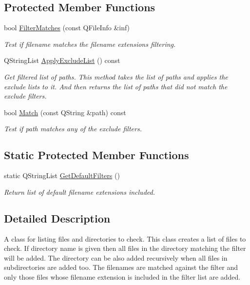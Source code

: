 \subsection*{Protected Member Functions}
\begin{DoxyCompactItemize}
\item 
bool \hyperlink{class_file_list_aa6de1569578fa3d9cfcbb51443680eb4}{Filter\-Matches} (const Q\-File\-Info \&inf)
\begin{DoxyCompactList}\small\item\em Test if filename matches the filename extensions filtering. \end{DoxyCompactList}\item 
Q\-String\-List \hyperlink{class_file_list_a3e55ac6cd21ebc3a06b556b649faa73a}{Apply\-Exclude\-List} () const 
\begin{DoxyCompactList}\small\item\em Get filtered list of paths. This method takes the list of paths and applies the exclude lists to it. And then returns the list of paths that did not match the exclude filters. \end{DoxyCompactList}\item 
bool \hyperlink{class_file_list_ad6769459107e55bd4c33761aab4cf6d7}{Match} (const Q\-String \&path) const 
\begin{DoxyCompactList}\small\item\em Test if path matches any of the exclude filters. \end{DoxyCompactList}\end{DoxyCompactItemize}
\subsection*{Static Protected Member Functions}
\begin{DoxyCompactItemize}
\item 
static Q\-String\-List \hyperlink{class_file_list_a2862f25abf1f3036edc6e4504bbfb87f}{Get\-Default\-Filters} ()
\begin{DoxyCompactList}\small\item\em Return list of default filename extensions included. \end{DoxyCompactList}\end{DoxyCompactItemize}


\subsection{Detailed Description}
A class for listing files and directories to check. This class creates a list of files to check. If directory name is given then all files in the directory matching the filter will be added. The directory can be also added recursively when all files in subdirectories are added too. The filenames are matched against the filter and only those files whose filename extension is included in the filter list are added. 


